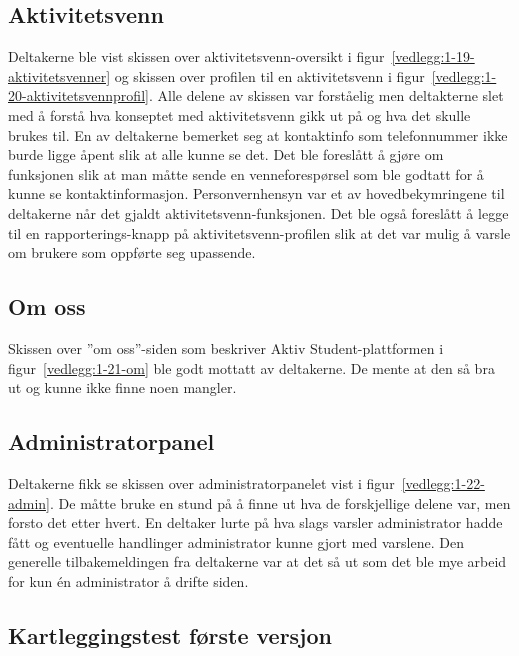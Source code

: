 \subsection{Aktivitetsvenn}

Deltakerne ble vist skissen over aktivitetsvenn-oversikt i figur~\ref{vedlegg:1-19-aktivitetsvenner} og skissen over profilen til en aktivitetsvenn i figur~\ref{vedlegg:1-20-aktivitetsvennprofil}. Alle delene av skissen var forståelig men deltakterne slet med å forstå hva konseptet med aktivitetsvenn gikk ut på og hva det skulle brukes til. En av deltakerne bemerket seg at kontaktinfo som telefonnummer ikke burde ligge åpent slik at alle kunne se det. Det ble foreslått å gjøre om funksjonen slik at man måtte sende en venneforespørsel som ble godtatt for å kunne se kontaktinformasjon. Personvernhensyn var et av hovedbekymringene til deltakerne når det gjaldt aktivitetsvenn-funksjonen. Det ble også foreslått å legge til en rapporterings-knapp på aktivitetsvenn-profilen slik at det var mulig å varsle om brukere som oppførte seg upassende.


\subsection{Om oss}

Skissen over ''om oss''-siden som beskriver Aktiv Student-plattformen i figur~\ref{vedlegg:1-21-om} ble godt mottatt av deltakerne. De mente at den så bra ut og kunne ikke finne noen mangler.

\subsection{Administratorpanel}

Deltakerne fikk se skissen over administratorpanelet vist i figur~\ref{vedlegg:1-22-admin}. De måtte bruke en stund på å finne ut hva de forskjellige delene var, men forsto det etter hvert. En deltaker lurte på hva slags varsler administrator hadde fått og eventuelle handlinger administrator kunne gjort med varslene. Den generelle tilbakemeldingen fra deltakerne var at det så ut som det ble mye arbeid for kun én administrator å drifte siden.


\subsection{Kartleggingstest første versjon}

